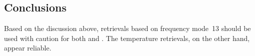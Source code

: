 \subsection{Conclusions}
\label{sec:fm13:conclusions}
Based on the discussion above, retrievals based on frequency mode~13 should be
used with caution for both  and . The temperature
retrievals, on the other hand, appear reliable.
